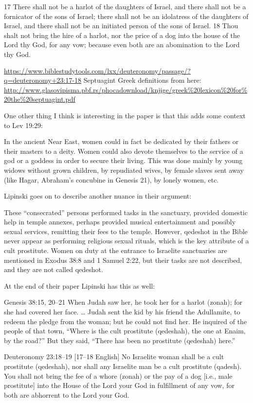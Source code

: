 \documentclass[11pt]{article}
\begin{document}
17 There shall not be a harlot of the daughters of Israel, and there shall not be a fornicator of the sons of Israel; there shall not be an idolatress of the daughters of Israel, and there shall not be an initiated person of the sons of Israel. 18 Thou shalt not bring the hire of a harlot, nor the price of a dog into the house of the Lord thy God, for any vow; because even both are an abomination to the Lord thy God.

\url{https://www.biblestudytools.com/lxx/deuteronomy/passage/?q=deuteronomy+23:17-18}
Septuagint Greek definitions from here: \url{http://www.glasovipisma.pbf.rs/phocadownload/knjige/greek%20lexicon%20for%20the%20septuagint.pdf}

One other thing I think is interesting in the paper is that this adds some context to Lev 19:29:

In the ancient Near East, women could in fact be dedicated by their fathers or their masters to a deity. Women could also devote themselves to the service of a god or a goddess in order to secure their living. This was done mainly by young widows without grown children, by repudiated wives, by female slaves sent away (like Hagar, Abraham’s concubine in Genesis 21), by lonely women, etc.

Lipinski goes on to describe another nuance in their argument:

These “consecrated” persons performed tasks in the sanctuary, provided domestic help in temple annexes, perhaps provided musical entertainment and possibly sexual services, remitting their fees to the temple. However, qedeshot in the Bible never appear as performing religious sexual rituals, which is the key attribute of a cult prostitute. Women on duty at the entrance to Israelite sanctuaries are mentioned in Exodus 38:8 and 1 Samuel 2:22, but their tasks are not described, and they are not called qedeshot.


At the end of their paper Lipinski has this as well:

Genesis 38:15, 20–21
When Judah saw her, he took her for a harlot (zonah); for she had covered her face.
…
Judah sent the kid by his friend the Adullamite, to redeem the pledge from the woman; but he could not find her. He inquired of the people of that town, “Where is the cult prostitute (qedeshah), the one at Enaim, by the road?” But they said, “There has been no prostitute (qedeshah) here.”

Deuteronomy 23:18–19 [17–18 English]
No Israelite woman shall be a cult prostitute (qedeshah), nor shall any Israelite man be a cult prostitute (qadesh). You shall not bring the fee of a whore (zonah) or the pay of a dog [i.e., male prostitute] into the House of the Lord your God in fulfillment of any vow, for both are abhorrent to the Lord your God.
\end{document}
